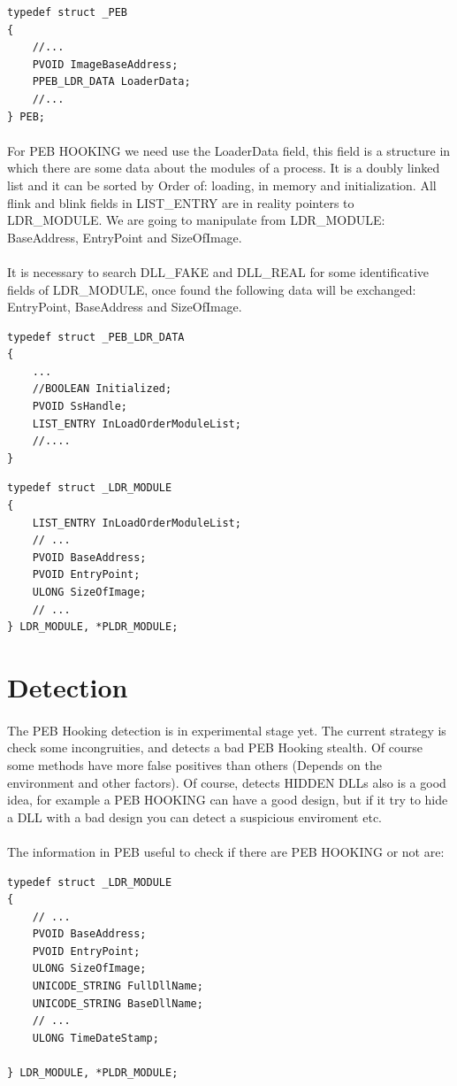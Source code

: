 \documentclass[12pt,a4paper,english]{book}
\newcommand{\paraph}{\paragraph{}}
\begin{document}
\lstset{language=C,caption=Process Environment Block}
\begin{lstlisting}
typedef struct _PEB
{
    //...
    PVOID ImageBaseAddress;
    PPEB_LDR_DATA LoaderData;
    //...
} PEB;
\end{lstlisting}

\paraph{}
For PEB HOOKING we need use the LoaderData field, this field is a structure in which there are some data about the modules of a process. It is a doubly linked list and it can be sorted by Order of: loading, in memory and initialization. All flink and blink fields in LIST\_ENTRY are in reality pointers to LDR\_MODULE. We are going to manipulate from LDR\_MODULE: BaseAddress, EntryPoint and SizeOfImage.

\paraph{}
It is necessary to search DLL\_FAKE and DLL\_REAL for some identificative fields of LDR\_MODULE, once found the following data will be exchanged: EntryPoint, BaseAddress and SizeOfImage.

\lstset{language=C,caption=PEB Loader Data}
\begin{lstlisting}
typedef struct _PEB_LDR_DATA
{
    ...
    //BOOLEAN Initialized;
    PVOID SsHandle;
    LIST_ENTRY InLoadOrderModuleList;
    //....
}
\end{lstlisting}

\lstset{language=C,caption=Loader Module Data}
\begin{lstlisting}
typedef struct _LDR_MODULE
{
    LIST_ENTRY InLoadOrderModuleList;
    // ...
    PVOID BaseAddress;
    PVOID EntryPoint;
    ULONG SizeOfImage;
    // ...
} LDR_MODULE, *PLDR_MODULE;
\end{lstlisting}

\section{Detection}
\paraph{}
The PEB Hooking detection is in experimental stage yet. The current strategy is check some incongruities, and detects a bad PEB Hooking stealth. Of course some methods have more false positives than others (Depends on the environment and other factors). Of course, detects HIDDEN DLLs also is a good idea, for example a PEB HOOKING can have a good design, but if it try to hide a DLL with a bad design you can detect a suspicious enviroment etc.

\paraph{} The information in PEB useful to check if there are PEB HOOKING or not are:
\lstset{language=C,caption=Loader Module Data useful for the detection}
\begin{lstlisting}
typedef struct _LDR_MODULE
{
    // ...
    PVOID BaseAddress;
    PVOID EntryPoint;
    ULONG SizeOfImage;
    UNICODE_STRING FullDllName;
    UNICODE_STRING BaseDllName;
    // ...
    ULONG TimeDateStamp;

} LDR_MODULE, *PLDR_MODULE;
\end{lstlisting}
\end{document}

